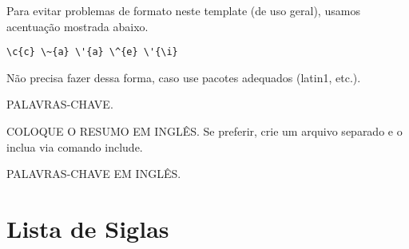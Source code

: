 \documentclass[phd, classic, a4paper]{ufbathesis}
\begin{document}
Para evitar problemas de formato neste template (de uso geral), usamos acentua\c{c}\~{a}o mostrada abaixo. 

\begin{verbatim} 
\c{c} \~{a} \'{a} \^{e} \'{\i}
\end{verbatim} 

N\~{a}o precisa fazer dessa forma, caso use pacotes adequados (latin1, etc.).

\begin{keywords}
PALAVRAS-CHAVE.
\end{keywords}


\abstract
COLOQUE O RESUMO EM INGL\^{E}S. Se preferir, crie um arquivo separado e o inclua via comando include.
\begin{keywords}
PALAVRAS-CHAVE EM INGL\^{E}S.
\end{keywords}


\tableofcontents

\listoffigures

\listoftables


\chapter*{Lista de Siglas}

\begin{acronym}[PGCOMP]
\end{acronym}


\mainmatter

% 
% 
% 
%
\end{document}
